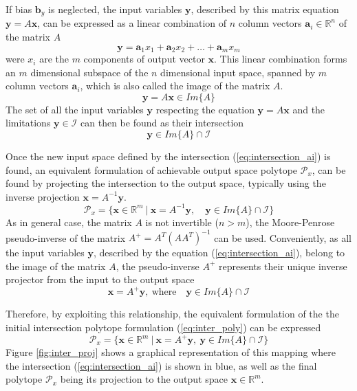 If bias $\bm{b}_y$ is neglected, the input variables $\bm{y}$, described by this matrix equation $\bm{y} = A\bm{x}$, can be expressed as a linear combination of $n$ column vectors $\bm{a}_i\in\mathbb{R}^n$ of the matrix $A$ \cite{LARSON2013}
\begin{equation}
    \bm{y} = \bm{a}_1x_1 +  \bm{a}_2x_2 + \ldots +  \bm{a}_mx_m
\end{equation}
were $x_i$ are the $m$ components of output vector $\bm{x}$. This linear combination forms an $m$ dimensional subspace of the $n$ dimensional input space, spanned by $m$ column vectors $\bm{a}_i$, which is also called the image of the matrix $A$. 
\begin{equation}
    \bm{y}=A\bm{x} \in Im \{A\}
\end{equation}
The set of all the input variables $\bm{y}$ respecting the equation $\bm{y} = A \bm{x}$ and the limitations $\bm{y}\in\mathcal{I}$ can then be found as their intersection
\begin{equation}
   \bm{y} \in Im\{A\} \cap \mathcal{I}
    \label{eq:intersection_ai}
\end{equation}

Once the new input space defined by the intersection (\ref{eq:intersection_ai}) is found, an equivalent formulation of achievable output space polytope $\mathcal{P}_x$, can be found by projecting the intersection to the output space, typically using the inverse projection $\bm{x}=A^{-1}\bm{y}$. 
\begin{equation}
    \mathcal{P}_x = \{\bm{x}\in\mathbb{R}^m~|~\bm{x} = A^{-1} \bm{y}, \quad \bm{y} \in Im\{A\}\cap\mathcal{I}\}
\end{equation}
As in general case, the matrix $A$ is not invertible ($n>m$), the Moore-Penrose pseudo-inverse \cite{wang2018generalized} of the matrix $A^+ = A^T(AA^T)^{-1}$ can be used. Conveniently, as all the input variables $\bm{y}$, described by the equation (\ref{eq:intersection_ai}), belong to the image of the matrix $A$, the pseudo-inverse $A^+$ represents their unique inverse projector from the input to the output space
\begin{equation}
    \bm{x} = A^+ \bm{y}, ~\text{where} \quad \bm{y} \in Im\{A\}\cap\mathcal{I}
\end{equation}

Therefore,  by exploiting this relationship,  the equivalent formulation of the the initial intersection polytope formulation (\ref{eq:inter_poly}) can be expressed
\begin{equation}
\mathcal{P}_x=\{\bm{x}\in\mathbb{R}^m~|~ \bm{x} = A^+\bm{y},~ \bm{y} \in Im\{A\}\cap\mathcal{I}\} \label{eq:proj_inter}
\end{equation}
Figure \ref{fig:inter_proj} shows a graphical representation of this mapping where the intersection (\ref{eq:intersection_ai}) is shown in blue, as well as the final polytope $\mathcal{P}_x$ being its projection to the output space $\bm{x}\in \mathbb{R}^m$. 

